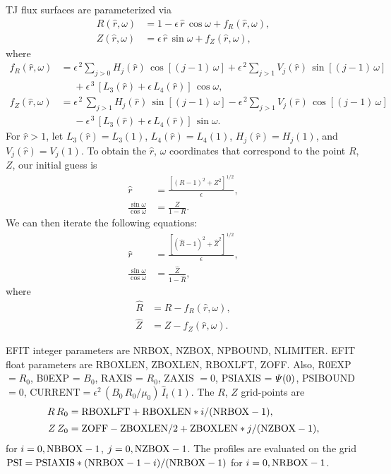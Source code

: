 \documentclass[12pt,prb,aps,notitlepage]{revtex4-1}
\begin{document}
TJ flux surfaces are parameterized via
\begin{align}
R(\hat{r},\omega) &= 1 -\epsilon\,\hat{r}\,\cos\omega +f_R(\hat{r},\omega),\\[0.5ex]
Z(\hat{r},\omega)&= \epsilon\,\hat{r}\,\sin\omega +f_Z(\hat{r},\omega),
\end{align}
where 
\begin{align}
f_R(\hat{r},\omega) &=  \epsilon^{\,2}\sum_{j>0}H_j(\hat{r})\,\cos[(j-1)\,\omega] + \epsilon^{\,2}\sum_{j>1}V_j(\hat{r})\,\sin[(j-1)\,\omega]\nonumber\\[0.5ex]
&\phantom{=}+\epsilon^{\,3}\,[L_3(\hat{r})+\epsilon\,L_4(\hat{r})]\,\cos\omega,\\[0.5ex]
f_Z(\hat{r},\omega)&= \epsilon^{\,2}\,\sum_{j>1}H_j(\hat{r})\,\sin[(j-1)\,\omega]
-\epsilon^{\,2}\sum_{j>1}V_j(\hat{r})\,\cos[(j-1)\,\omega]\nonumber\\[0.5ex]&\phantom{=}-
\epsilon^{\,3}\,[L_3(\hat{r})+\epsilon\,L_4(\hat{r})]\,\sin\omega.
\end{align}
For $\hat{r}>1$, let $L_3(\hat{r}) = L_3(1)$, $L_4(\hat{r})=L_4(1)$, $H_j(\hat{r})= H_j(1)$, and $V_j(\hat{r})= V_j(1)$. 
To obtain the $\hat{r}$, $\omega$ coordinates that correspond to the point $R$, $Z$, our initial guess is
\begin{align}
\hat{r} &= \frac{[(R-1)^2+Z^2]^{1/2}}{\epsilon},\\[0.5ex]
\frac{\sin\omega}{\cos\omega} &= \frac{Z}{1-R}.
\end{align}
We can then iterate the following equations:
\begin{align}
\hat{r} &= \frac{[(\hat{R}-1)^2+\hat{Z}^2]^{1/2}}{\epsilon},\\[0.5ex]
\frac{\sin\omega}{\cos\omega} &= \frac{\hat{Z}}{1-\hat{R}},
\end{align}
where
\begin{align}
\hat{R} &=R-f_R(\hat{r},\omega),\\[0.5ex]
\hat{Z} &= Z-f_Z(\hat{r},\omega).
\end{align}

EFIT integer parameters are NRBOX, NZBOX, NPBOUND, NLIMITER. EFIT float parameters are RBOXLEN, ZBOXLEN, RBOXLFT, ZOFF. 
Also, R0EXP $= R_0$, B0EXP = $B_0$, RAXIS = $R_0$, ZAXIS $=0$, PSIAXIS = ${\mit\Psi}(0)$, PSIBOUND $=0$, CURRENT$= \epsilon^2\,(B_0\,R_0/\mu_0)\,\hat{I}_t(1)$. The $R$, $Z$ grid-points are 
\begin{align}
R\,R_0&= {\rm RBOXLFT} + {\rm RBOXLEN} *  i /({\rm NRBOX}-1),\\[0.5ex]
Z\,Z_0 &= {\rm ZOFF} - {\rm ZBOXLEN}/2 + {\rm ZBOXLEN} * j /({\rm NZBOX}-1),
\end{align}
for $i=0,{\rm NBBOX}-1$, $j=0,{\rm NZBOX}-1$. The profiles are evaluated on the grid ${\rm PSI} = {\rm PSIAXIS} * ({\rm NRBOX}- 1 - i)/({\rm NRBOX}-1)$
for $i=0, {\rm NRBOX}-1$. 
\end{document}
